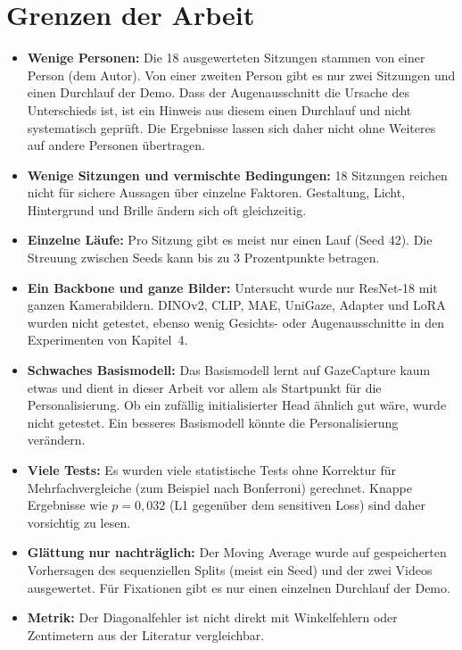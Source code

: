 \section{Grenzen der Arbeit}
\label{sec:grenzen}
\begin{itemize}
  \item \textbf{Wenige Personen:} Die 18 ausgewerteten Sitzungen stammen von
        einer Person (dem Autor). Von einer zweiten Person gibt es nur zwei
        Sitzungen und einen Durchlauf der Demo. Dass der Augenausschnitt die
        Ursache des Unterschieds ist, ist ein Hinweis aus diesem einen
        Durchlauf und nicht systematisch geprüft. Die Ergebnisse lassen sich
        daher nicht ohne Weiteres auf andere Personen übertragen.
  \item \textbf{Wenige Sitzungen und vermischte Bedingungen:} 18 Sitzungen
        reichen nicht für sichere Aussagen über einzelne Faktoren. Gestaltung,
        Licht, Hintergrund und Brille ändern sich oft gleichzeitig.
  \item \textbf{Einzelne Läufe:} Pro Sitzung gibt es meist nur einen Lauf
        (Seed 42). Die Streuung zwischen Seeds kann bis zu 3 Prozentpunkte
        betragen.
  \item \textbf{Ein Backbone und ganze Bilder:} Untersucht wurde nur ResNet-18
        mit ganzen Kamerabildern. DINOv2, CLIP, MAE, UniGaze, Adapter und LoRA
        wurden nicht getestet, ebenso wenig Gesichts- oder Augenausschnitte in
        den Experimenten von Kapitel~4.
  \item \textbf{Schwaches Basismodell:} Das Basismodell lernt auf GazeCapture
        kaum etwas und dient in dieser Arbeit vor allem als Startpunkt für die
        Personalisierung. Ob ein zufällig initialisierter Head ähnlich gut
        wäre, wurde nicht getestet. Ein besseres Basismodell könnte die
        Personalisierung verändern.
  \item \textbf{Viele Tests:} Es wurden viele statistische Tests ohne Korrektur
        für Mehrfachvergleiche (zum Beispiel nach Bonferroni) gerechnet.
        Knappe Ergebnisse wie $p=0,032$ (L1 gegenüber dem sensitiven Loss) sind
        daher vorsichtig zu lesen.
  \item \textbf{Glättung nur nachträglich:} Der Moving Average wurde auf
        gespeicherten Vorhersagen des sequenziellen Splits (meist ein Seed)
        und der zwei Videos ausgewertet. Für Fixationen gibt es nur einen
        einzelnen Durchlauf der Demo.
  \item \textbf{Metrik:} Der Diagonalfehler ist nicht direkt mit Winkelfehlern
        oder Zentimetern aus der Literatur vergleichbar.
\end{itemize}
